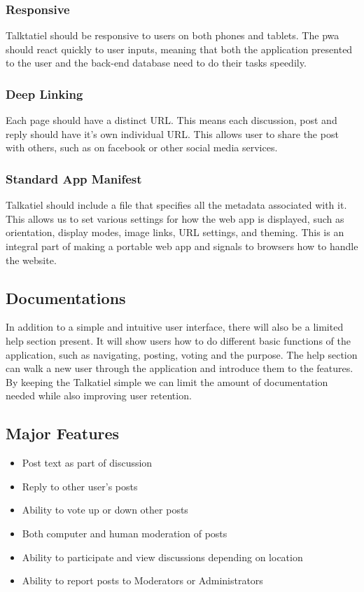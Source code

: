 \documentclass[12pt]{article}
\begin{document}
\subsubsection{Responsive}
Talktatiel should be responsive to users on both phones and tablets.  The pwa should react quickly to user inputs, meaning that both the application presented to the user and the back-end database need to do their tasks speedily.
\subsubsection{Deep Linking}
Each page should have a distinct URL.  This means each discussion, post and reply should have it's own individual URL.  This allows user to share the post with others, such as on facebook or other social media services.
\subsubsection{Standard App Manifest}
Talkatiel should include a file that specifies all the metadata associated with it.
This allows us to set various settings for how the web app is displayed, such as orientation, display modes, image links, URL settings, and theming.  This is an integral part of making a portable web app and signals to browsers how to handle the website.
\subsection{Documentations}
In addition to a simple and intuitive user interface, there will also be a limited help section present.  It will show users how to do different basic functions of the application, such as navigating, posting, voting and the purpose.  The help section can walk a new user through the application and introduce them to the features.  By keeping the Talkatiel simple we can limit the amount of documentation needed while also improving user retention.
\subsection{Major Features}
\begin{itemize}
      \item Post text as part of discussion
      \item Reply to other user's posts
      \item Ability to vote up or down other posts
      \item Both computer and human moderation of posts
      \item Ability to participate and view discussions depending on location
      \item Ability to report posts to Moderators or Administrators
\end{itemize}
\end{document}
